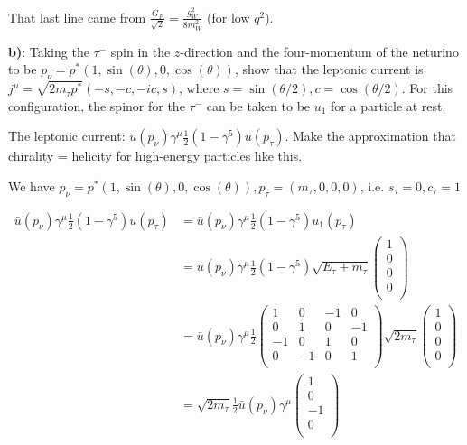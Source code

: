 That last line came from $\frac{G_F}{\sqrt{2}} = \frac{g_W^2}{8m_W^2}$ (for low $q^2$).

\textbf{b)}: Taking the $\tau^-$ spin in the $z$-direction and the four-momentum of the neturino to be $p_\nu = p^*(1, \sin(\theta), 0, \cos(\theta))$, show that the leptonic current is $j^\mu = \sqrt{2m_\tau p^*}(-s,-c,-ic,s)$, where $s=\sin(\theta/2), c=\cos(\theta/2)$. For this configuration, the spinor for the $\tau^-$ can be taken to be $u_1$ for a particle at rest.

The leptonic current: $\bar{u}(p_\nu)\gamma^\mu\frac{1}{2}(1-\gamma^5) u(p_\tau)$. Make the approximation that chirality = helicity for high-energy particles like this.

We have $p_\nu = p^*(1, \sin(\theta), 0, \cos(\theta)), p_\tau = (m_\tau, 0, 0, 0)$, i.e. $s_\tau=0, c_\tau=1$

\begin{align*}
    \bar{u}(p_\nu)\gamma^\mu\frac{1}{2}(1-\gamma^5) u(p_\tau)
    &= \bar{u}(p_\nu)\gamma^\mu\frac{1}{2}(1-\gamma^5) u_1(p_\tau) \\
    &= \bar{u}(p_\nu)\gamma^\mu\frac{1}{2}(1-\gamma^5) \sqrt{E_\tau + m_\tau}\begin{pmatrix}
        1 \\ 0 \\ 0 \\ 0 \\
    \end{pmatrix} \\
    &= \bar{u}(p_\nu)\gamma^\mu\frac{1}{2}\begin{pmatrix}
        1 & 0 & -1 & 0\\
        0 & 1 & 0 & -1\\
        -1 & 0 & 1 & 0 \\
        0 & -1 & 0 & 1 \\
    \end{pmatrix} \sqrt{2m_\tau}\begin{pmatrix}
        1 \\ 0 \\ 0 \\ 0 \\
    \end{pmatrix} \\
    &= \sqrt{2m_\tau}\frac{1}{2}\bar{u}(p_\nu)\gamma^\mu\begin{pmatrix}
        1 \\
        0 \\
        -1 \\
        0 \\
    \end{pmatrix} \\
\end{align*}

